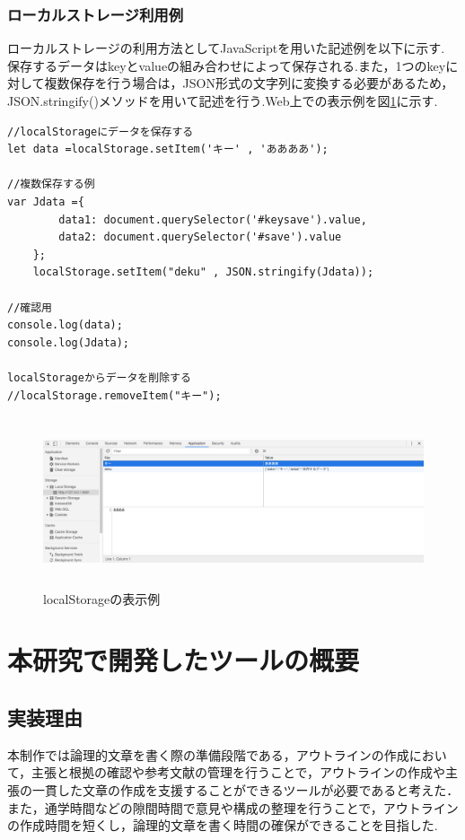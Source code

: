 \documentclass[a4j,12pt]{jarticle}
\begin{document}
\subsubsection{ローカルストレージ利用例}
ローカルストレージの利用方法としてJavaScriptを用いた記述例を以下に示す.
保存するデータはkeyとvalueの組み合わせによって保存される.また，1つのkeyに対して複数保存を行う場合は，JSON形式の文字列に変換する必要があるため，JSON.stringify()メソッドを用いて記述を行う.Web上での表示例を図\ref{fig:z}に示す.
\begin{lstlisting}[caption=利用例,label=s4]
//localStorageにデータを保存する
let data =localStorage.setItem('キー' , 'ああああ');

//複数保存する例
var Jdata ={
        data1: document.querySelector('#keysave').value,
        data2: document.querySelector('#save').value
    };
    localStorage.setItem("deku" , JSON.stringify(Jdata));
 
//確認用
console.log(data);
console.log(Jdata);

localStorageからデータを削除する
//localStorage.removeItem("キー");
\end{lstlisting}
\newpage
\begin{figure}[h]
\begin{center}
 \includegraphics[clip,width=150mm,height=50mm]{figure/11localeST.png}
\end{center}
 \caption{localStorageの表示例}
 \label{fig:z}
\end{figure}
\newpage

\section{本研究で開発したツールの概要}
\subsection{実装理由}
本制作では論理的文章を書く際の準備段階である，アウトラインの作成において，主張と根拠の確認や参考文献の管理を行うことで，アウトラインの作成や主張の一貫した文章の作成を支援することができるツールが必要であると考えた．また，通学時間などの隙間時間で意見や構成の整理を行うことで，アウトラインの作成時間を短くし，論理的文章を書く時間の確保ができることを目指した.
\end{document}
